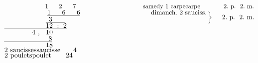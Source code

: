 %
$\displaystyle\hspace*{22,5mm}1\hspace*{6mm}2\hspace*{6mm}7%
\hspace*{37,5mm}\mbox{samedy}\ 1\ \mbox{carpe\protect\index{Sachverzeichnis}{carpe}}\hspace*{13,1mm}2.\ \mbox{p.}\ \ 2.\ \mbox{m.}$\\
%
$\displaystyle\hspace*{22,5mm}\underline{1\hspace*{6mm}6\hspace*{6mm}6}%
\hspace*{37,5mm}\mbox{dimanch.}\ 2\ \mbox{sauciss.}%
\, \raisebox{-7pt}[0pt][0pt]{\Big\}}%
\hspace*{5,2mm}\raisebox{-7pt}[0pt][0pt]{2.\ \mbox{p.}\ \ 2.\ \mbox{m.}}$\\
%
$\displaystyle\hspace*{21mm}\underline{\hspace*{1,5mm}3\hspace*{6,6mm}}$\\
%
$\displaystyle\underline{\hspace*{21mm}12\ :\ 2}$\\
%
$\displaystyle\hspace*{14mm}4 \ ,\hspace*{2,5mm}10$\\
%
$\displaystyle\underline{\hspace*{22,5mm}8}$\\
%
$\displaystyle\hspace*{21mm}18$\\
%
$\displaystyle\mbox{2 saucisses\protect\index{Sachverzeichnis}{saucisse}}\hspace*{6,5mm}4$\\
%
$\displaystyle\mbox{2 poulets\protect\index{Sachverzeichnis}{poulet}}\hspace*{7,3mm}24\vspace{0,5mm}$\\
